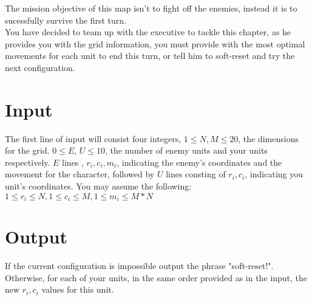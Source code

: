 \noindent The mission objective of this map isn't to fight off the enemies, instead it is to sucessfully survive the
first turn.\\

\noindent You have decided to team up with the executive to tackle this chapter, as he provides you with the grid
information, you must provide with the most optimal movements for each unit to end this turn, or tell him to soft-reset
and try the next configuration. \\

\section*{Input}
The first line of input will consist four integers, $1 \leq N, M \leq 20$, the dimensions for the grid.
$0 \leq E ,\, U \leq 10$, the number of enemy units and your units respectively. $E$ lines , $r_i, c_i, m_i$, indicating
the enemy's coordinates and the movement for the character, followed by $U$ lines consting of $r_i, c_i$, indicating
 you unit's coordinates. You may assume the following: $1 \leq r_i \leq N, 1 \leq c_i \leq M, 1 \leq m_i \leq M*N$ \\

\section*{Output}
If the current configuration is impossible output the phrase "soft-reset!". Otherwise, for each of your units, in the
same order provided as in the input, the new $r_i, c_i$ values for this unit.

